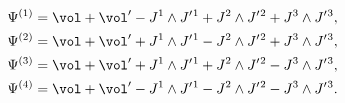 \begin{equation}
\begin{aligned}
   \Psi^{(1)} &= \vol + \vol' - J^1 \wedge J'{}^1 + J^2 \wedge J'{}^2
      + J^3 \wedge J'{}^3 , \\
   \Psi^{(2)} &= \vol + \vol' + J^1 \wedge J'{}^1 - J^2 \wedge J'{}^2
      + J^3 \wedge J'{}^3 , \\
   \Psi^{(3)} &= \vol + \vol' + J^1 \wedge J'{}^1 + J^2 \wedge J'{}^2
      - J^3 \wedge J'{}^3 , \\
   \Psi^{(4)} &= \vol + \vol' - J^1 \wedge J'{}^1 - J^2 \wedge J'{}^2
      - J^3 \wedge J'{}^3 .
\end{aligned}
\end{equation}

